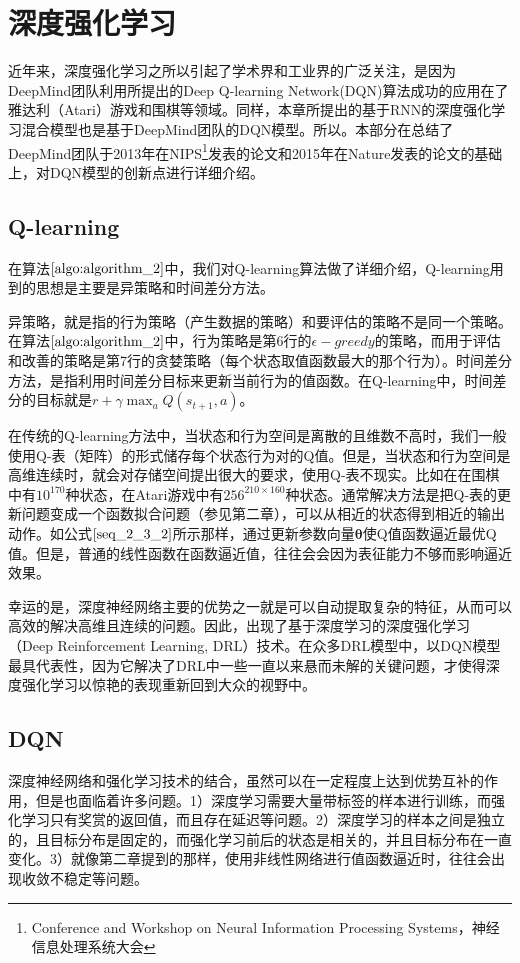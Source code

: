\section{深度强化学习}
近年来，深度强化学习之所以引起了学术界和工业界的广泛关注，是因为DeepMind团队利用所提出的Deep Q-learning Network(DQN)算法成功的应用在了雅达利（Atari）游戏和围棋等领域。同样，本章所提出的基于RNN的深度强化学习混合模型也是基于DeepMind团队的DQN模型。所以。本部分在总结了DeepMind团队于2013年在NIPS\footnote{Conference and Workshop on Neural Information Processing Systems，神经信息处理系统大会}发表的论文\citep{mnih2013playing}和2015年在Nature发表的论文\citep{mnih2015human}的基础上，对DQN模型的创新点进行详细介绍。

\subsection{Q-learning}
在算法$\ref{algo:algorithm_2}$中，我们对Q-learning算法做了详细介绍，Q-learning用到的思想是主要是异策略和时间差分方法。

异策略，就是指的行为策略（产生数据的策略）和要评估的策略不是同一个策略。在算法$\ref{algo:algorithm_2}$中，行为策略是第6行的$\epsilon-greedy$的策略，而用于评估和改善的策略是第7行的贪婪策略（每个状态取值函数最大的那个行为）。时间差分方法，是指利用时间差分目标来更新当前行为的值函数。在Q-learning中，时间差分的目标就是$r+\gamma \max_{a} Q(s_{t+1},a)$。

在传统的Q-learning方法中，当状态和行为空间是离散的且维数不高时，我们一般使用Q-表（矩阵）的形式储存每个状态行为对的Q值。但是，当状态和行为空间是高维连续时，就会对存储空间提出很大的要求，使用Q-表不现实。比如在在围棋中有$10^{170}$种状态，在Atari游戏中有$256^{210\times160}$种状态。通常解决方法是把Q-表的更新问题变成一个函数拟合问题（参见第二章），可以从相近的状态得到相近的输出动作。如公式$\eqref{seq_2_3_2}$所示那样，通过更新参数向量$\mathbf{\theta}$使Q值函数逼近最优Q值。但是，普通的线性函数在函数逼近值，往往会会因为表征能力不够而影响逼近效果。

幸运的是，深度神经网络主要的优势之一就是可以自动提取复杂的特征，从而可以高效的解决高维且连续的问题。因此，出现了基于深度学习的深度强化学习（Deep Reinforcement Learning, DRL）技术。在众多DRL模型中，以DQN模型最具代表性，因为它解决了DRL中一些一直以来悬而未解的关键问题，才使得深度强化学习以惊艳的表现重新回到大众的视野中。

\subsection{DQN}
 深度神经网络和强化学习技术的结合，虽然可以在一定程度上达到优势互补的作用，但是也面临着许多问题。1）深度学习需要大量带标签的样本进行训练，而强化学习只有奖赏的返回值，而且存在延迟等问题。2）深度学习的样本之间是独立的，且目标分布是固定的，而强化学习前后的状态是相关的，并且目标分布在一直变化。3）就像第二章提到的那样，使用非线性网络进行值函数逼近时，往往会出现收敛不稳定等问题。

